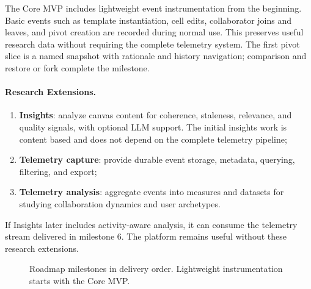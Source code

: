 \documentclass[11pt,a4paper]{article}
\begin{document}
The Core MVP includes lightweight event instrumentation from the beginning. Basic events such as template instantiation, cell edits, collaborator joins and leaves, and pivot creation are recorded during normal use. This preserves useful research data without requiring the complete telemetry system. The first pivot slice is a named snapshot with rationale and history navigation; comparison and restore or fork complete the milestone.

\paragraph{Research Extensions.}
\begin{enumerate}
  \item[5.] \textbf{Insights}: analyze canvas content for coherence, staleness, relevance, and quality signals, with optional LLM support. The initial insights work is content based and does not depend on the complete telemetry pipeline;
  \item[6.] \textbf{Telemetry capture}: provide durable event storage, metadata, querying, filtering, and export;
  \item[7.] \textbf{Telemetry analysis}: aggregate events into measures and datasets for studying collaboration dynamics and user archetypes.
\end{enumerate}

If Insights later includes activity-aware analysis, it can consume the telemetry stream delivered in milestone 6. The platform remains useful without these research extensions.

\begin{figure}[h]
  \centering
  \caption{Roadmap milestones in delivery order. Lightweight instrumentation starts with the Core MVP.}
\end{figure}
\end{document}
